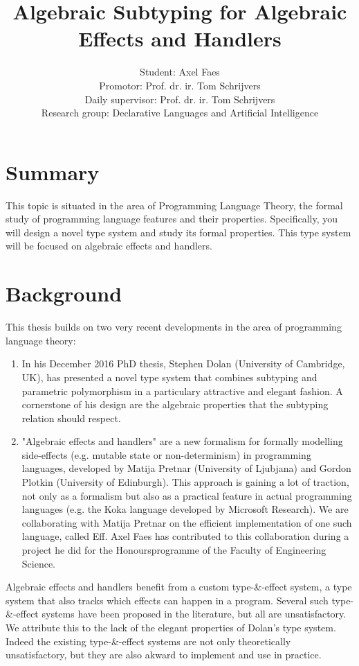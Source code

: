 \documentclass[notitlepage]{article}
\title{\vspace{-2cm}Algebraic Subtyping for Algebraic Effects and Handlers}
\author{Student: Axel Faes\\{Promotor: Prof. dr. ir. Tom Schrijvers}\\{Daily supervisor: Prof. dr. ir. Tom Schrijvers}\\{Research group: Declarative Languages and Artificial Intelligence}}
\date{}
\begin{document}
\maketitle

\section{Summary}
This topic is situated in the area of Programming Language Theory, the formal study of programming language features and their properties. Specifically, you will design a novel type system and study its formal properties. This type system will be focused on algebraic effects and handlers. 

\section{Background}
This thesis builds on two very recent developments in the area of programming language theory:
\begin{enumerate}
\item In his December 2016 PhD thesis, Stephen Dolan (University of Cambridge, UK), has presented a novel type system that combines subtyping and parametric polymorphism in a particulary attractive and elegant fashion. A cornerstone of his design are the algebraic properties that the subtyping relation should respect.
\item "Algebraic effects and handlers" are a new formalism for formally modelling side-effects (e.g. mutable state or non-determinism) in programming languages, developed by Matija Pretnar (University of Ljubjana) and Gordon Plotkin (University of Edinburgh). This approach is gaining a lot of traction, not only as a formalism but also as a practical feature in actual programming languages (e.g. the Koka language developed by Microsoft Research). We are collaborating with Matija Pretnar on the efficient implementation of one such language, called Eff. Axel Faes has contributed to this collaboration during a project he did for the Honoursprogramme of the Faculty of Engineering Science.
\end{enumerate}
Algebraic effects and handlers benefit from a custom type-\&-effect system, a type system that also tracks which effects can happen in a program. Several such type-\&-effect systems have been proposed in the literature, but all are unsatisfactory. We attribute this to the lack of the elegant properties of Dolan's type system. Indeed the existing type-\&-effect systems are not only theoretically unsatisfactory, but they are also akward to implement and use in practice.
\end{document}
